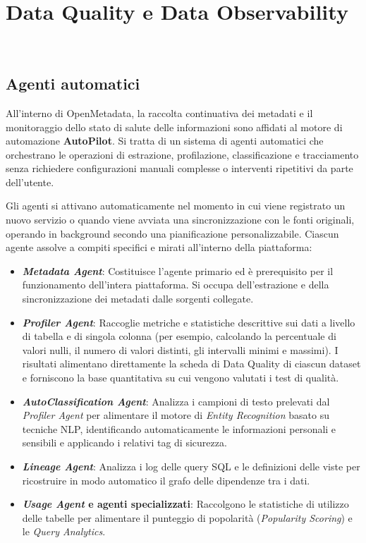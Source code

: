 \chapter{Data Quality e Data Observability}
\label{cap:quality-observability}

\\

\section{Agenti automatici}
All'interno di OpenMetadata, la raccolta continuativa dei metadati e il monitoraggio dello stato di salute delle informazioni sono affidati al motore di automazione \textbf{AutoPilot}. 
Si tratta di un sistema di agenti automatici che orchestrano le operazioni di estrazione, profilazione, classificazione e tracciamento senza richiedere configurazioni 
manuali complesse o interventi ripetitivi da parte dell'utente.

Gli agenti si attivano automaticamente nel momento in cui viene registrato un nuovo servizio o quando viene avviata una sincronizzazione con le fonti originali, 
operando in background secondo una pianificazione personalizzabile. Ciascun agente assolve a compiti specifici e mirati all'interno della piattaforma:
\begin{itemize}
    \item \textbf{\emph{Metadata Agent}}: Costituisce l'agente primario ed è prerequisito per il funzionamento dell'intera piattaforma. Si occupa dell'estrazione e della sincronizzazione dei metadati dalle sorgenti collegate.
    \item \textbf{\emph{Profiler Agent}}: Raccoglie metriche e statistiche descrittive sui dati a livello di tabella e di singola colonna (per esempio, calcolando la percentuale di valori nulli, il numero di valori distinti, gli intervalli minimi e massimi). I risultati alimentano direttamente la scheda di Data Quality di ciascun dataset e forniscono la base quantitativa su cui vengono valutati i test di qualità.
    \item \textbf{\emph{AutoClassification Agent}}: Analizza i campioni di testo prelevati dal \emph{Profiler Agent} per alimentare il motore di \emph{Entity Recognition} basato su tecniche NLP, identificando automaticamente le informazioni personali e sensibili e applicando i relativi tag di sicurezza.
    \item \textbf{\emph{Lineage Agent}}: Analizza i log delle query SQL e le definizioni delle viste per ricostruire in modo automatico il grafo delle dipendenze tra i dati.
    \item \textbf{\emph{Usage Agent} e agenti specializzati}: Raccolgono le statistiche di utilizzo delle tabelle per alimentare il punteggio di popolarità (\emph{Popularity Scoring}) e le \emph{Query Analytics}.
\end{itemize}

